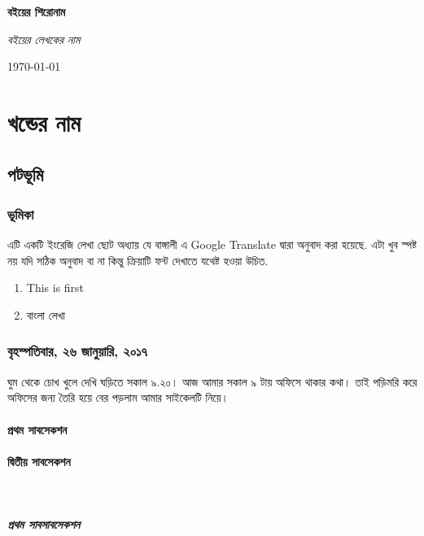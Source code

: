 \documentclass[12pt]{report}
\begin{document}
\begin{titlepage}
	\centering
	\vspace{1.5cm}
	{\huge\bfseries বইয়ের শিরোনাম \par}
	\vspace{1.25cm}
	{\Large\itshape বইয়ের লেখকের নাম \par}
	\vfill

	{\large \today\par}
\end{titlepage}

\tableofcontents

\part{খন্ডের নাম}
\chapter{পটভূমি}
\section{ভূমিকা}
এটি একটি ইংরেজি লেখা ছোট অধ্যায় যে বাঙ্গালী এ \textenglish{Google Translate} দ্বারা অনুবাদ করা হয়েছে. এটা খুব স্পষ্ট নয় যদি সঠিক অনুবাদ বা না কিন্তু ক্রিয়াটি ফন্ট দেখাতে যথেষ্ট হওয়া উচিত.

\begin{enumerate}
    \item   \foreignlanguage{english}{This is first}
    \item   বাংলা লেখা
\end{enumerate}

\section{বৃহস্পতিবার, ২৬ জানুয়ারি, ২০১৭}
ঘুম থেকে চোখ খুলে দেখি ঘড়িতে সকাল ৯.২০। আজ আমার সকাল ৯ টায় অফিসে থাকার কথা। তাই পড়িমরি করে অফিসের জন্য তৈরি হয়ে বের পড়লাম আমার সাইকেলটি নিয়ে।

\subsection{প্রথম সাবসেকশন}
\subsection{দ্বিতীয় সাবসেকশন}
‌‌\subsubsection{প্রথম সাবসাবসেকশন}
\end{document}
